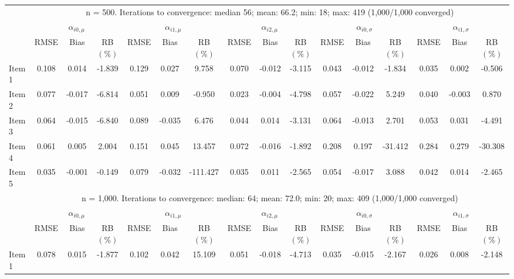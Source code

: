 \documentclass[11pt, a4paper]{article}
\begin{document}
\begin{table}[h!]
{{\begin{tabular}{lccccccccccccccc}
& \multicolumn{15}{c}{\multirow{2}{*}{n = 500. Iterations to convergence: median 56; mean: 66.2; min: 18; max: 419 (1,000/1,000 converged)}} \\ & \\
\cmidrule(lr){2-16}
& \multicolumn{3}{c}{$\alpha_{i0,\mu}$} & \multicolumn{3}{c}{$\alpha_{i1,\mu}$} & \multicolumn{3}{c}{$\alpha_{i2,\mu}$} & \multicolumn{3}{c}{$\alpha_{i0,\sigma}$} & \multicolumn{3}{c}{$\alpha_{i1,\sigma}$}\\ 
& RMSE & Bias & RB $(\%)$ & RMSE & Bias & RB $(\%)$ & RMSE & Bias & RB $(\%)$ & RMSE & Bias & RB $(\%)$ & RMSE & Bias & RB $(\%)$ \\ \cmidrule(lr){2-4} \cmidrule(lr){5-7} \cmidrule(lr){8-10} \cmidrule(lr){11-13} \cmidrule(lr){14-16}
Item 1 & 0.108 & 0.014 & -1.839 & 0.129 & 0.027 & 9.758 & 0.070 & -0.012 & -3.115 & 0.043 & -0.012 & -1.834 & 0.035 & 0.002 & -0.506 \\ 
Item 2 & 0.077 & -0.017 & -6.814 & 0.051 & 0.009 & -0.950 & 0.023 & -0.004 & -4.798 & 0.057 & -0.022 & 5.249 & 0.040 & -0.003 & 0.870 \\ 
Item 3 & 0.064 & -0.015 & -6.840 & 0.089 & -0.035 & 6.476 & 0.044 & 0.014 & -3.131 & 0.064 & -0.013 & 2.701 & 0.053 & 0.031 & -4.491 \\ 
Item 4 & 0.061 & 0.005 & 2.004 & 0.151 & 0.045 & 13.457 & 0.072 & -0.016 & -1.892 & 0.208 & 0.197 & -31.412 & 0.284 & 0.279 & -30.308 \\ 
Item 5 & 0.035 & -0.001 & -0.149 & 0.079 & -0.032 & -111.427 & 0.035 & 0.011 & -2.565 & 0.054 & -0.017 & 3.088 & 0.042 & 0.014 & -2.465 \\ 
\cmidrule(lr){2-16}
& \multicolumn{15}{c}{\multirow{2}{*}{n = 1,000. Iterations to convergence: median: 64; mean: 72.0; min: 20; max: 409 (1,000/1,000 converged)}} \\ & \\
\cmidrule(lr){2-16}
& \multicolumn{3}{c}{$\alpha_{i0,\mu}$} & \multicolumn{3}{c}{$\alpha_{i1,\mu}$} & \multicolumn{3}{c}{$\alpha_{i2,\mu}$} & \multicolumn{3}{c}{$\alpha_{i0,\sigma}$} & \multicolumn{3}{c}{$\alpha_{i1,\sigma}$}\\ 
& RMSE & Bias & RB $(\%)$ & RMSE & Bias & RB $(\%)$ & RMSE & Bias & RB $(\%)$ & RMSE & Bias & RB $(\%)$ & RMSE & Bias & RB $(\%)$ \\ \cmidrule(lr){2-4} \cmidrule(lr){5-7} \cmidrule(lr){8-10} \cmidrule(lr){11-13} \cmidrule(lr){14-16}
Item 1 & 0.078 & 0.015 & -1.877 & 0.102 & 0.042 & 15.109 & 0.051 & -0.018 & -4.713 & 0.035 & -0.015 & -2.167 & 0.026 & 0.008 & -2.148 \\ 

\end{tabular}}}
\end{table}
\end{document}
